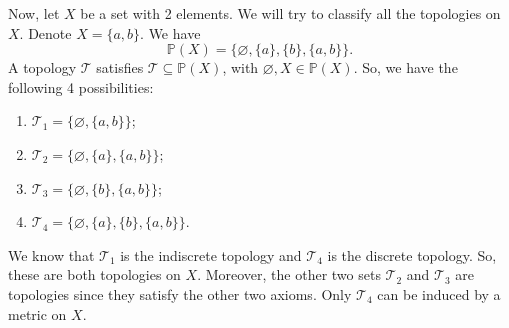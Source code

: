 \documentclass[a4paper, openany]{memoir}
\theoremstyle{definition}
\theoremstyle{plain}
\begin{document}
Now, let $X$ be a set with 2 elements. We will try to classify all the topologies on $X$. Denote $X = \{a, b\}$. We have
\[\mathbb{P}(X) = \{\varnothing, \{a\}, \{b\}, \{a, b\}\}.\]
A topology $\mathcal{T}$ satisfies $\mathcal{T} \subseteq \mathbb{P}(X)$, with $\varnothing , X \in \mathbb{P}(X)$. So, we have the following 4 possibilities:
\begin{enumerate}
    \item $\mathcal{T}_1 = \{\varnothing, \{a, b\}\}$;
    \item $\mathcal{T}_2 = \{\varnothing, \{a\}, \{a, b\}\}$;
    \item $\mathcal{T}_3 = \{\varnothing, \{b\}, \{a, b\}\}$;
    \item $\mathcal{T}_4 = \{\varnothing, \{a\}, \{b\}, \{a, b\}\}$.
\end{enumerate}
We know that $\mathcal{T}_1$ is the indiscrete topology and $\mathcal{T}_4$ is the discrete topology. So, these are both topologies on $X$. Moreover, the other two sets $\mathcal{T}_2$ and $\mathcal{T}_3$ are topologies since they satisfy the other two axioms. Only $\mathcal{T}_4$ can be induced by a metric on $X$. 
\newpage
\end{document}
